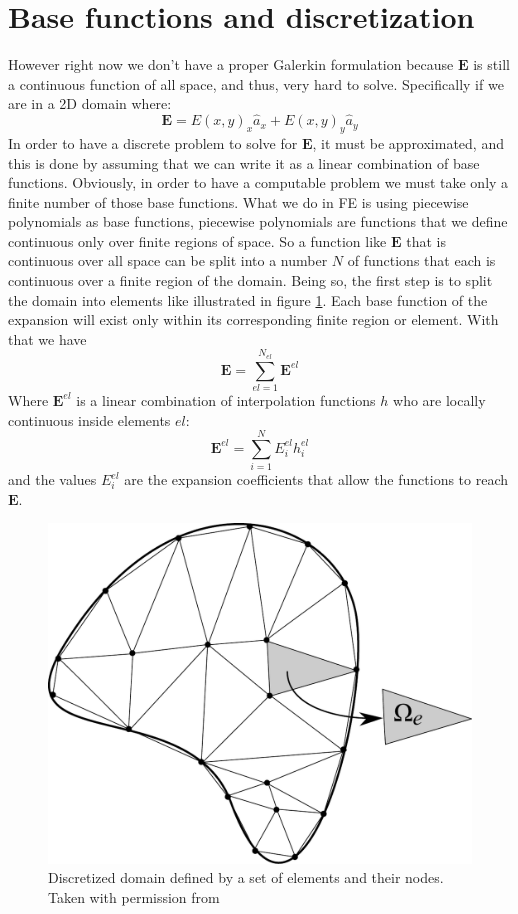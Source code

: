\section{Base functions and discretization}
However right now we don't have a proper Galerkin formulation because $\mathbf{E}$ is still a continuous function of all space, and thus, very hard to solve. Specifically if we are in a 2D domain where:
$$\mathbf{E}=E(x,y)_x\hat{a}_x + E(x,y)_y \hat{a}_y $$
In order to have a discrete problem to solve for $\mathbf{E}$, it must be approximated, and this is done by assuming that we can write it as a linear combination of base functions. Obviously, in order to have a computable problem we must take only a finite number of those base functions. What we do in FE is using piecewise polynomials as base functions, piecewise polynomials are functions that we define continuous only over finite regions of space. So a function like $\mathbf{E}$ that is continuous over all space can be split into a number $N$ of functions that each is continuous over a finite region of the domain. 
Being so, the first step is to split the domain into elements like illustrated in figure \ref{fig:disc_domain}. Each base function of the expansion will exist only within its corresponding finite region or element. With that we have
\begin{equation}
\mathbf{E} = \sum_{el=1}^{N_{el}}\mathbf{E}^{el}
\end{equation}
Where $\mathbf{E}^{el}$ is a linear combination of interpolation functions $h$ who are locally continuous inside elements $el$:
\begin{equation}
\mathbf{E}^{el} = \sum_{i =1}^N E_i^{el}h_i^{el}
\end{equation}
and the values $E_i^{el}$ are the expansion coefficients that allow the functions to reach $\mathbf{E}$.
\begin{figure}
\centering
\includegraphics[scale=0.3]{./img/dominio_discreto.pdf}
\caption{Discretized domain defined by a set of elements and their nodes. Taken with permission from \cite{Guarin2012}}
\label{fig:disc_domain}
\end{figure}
